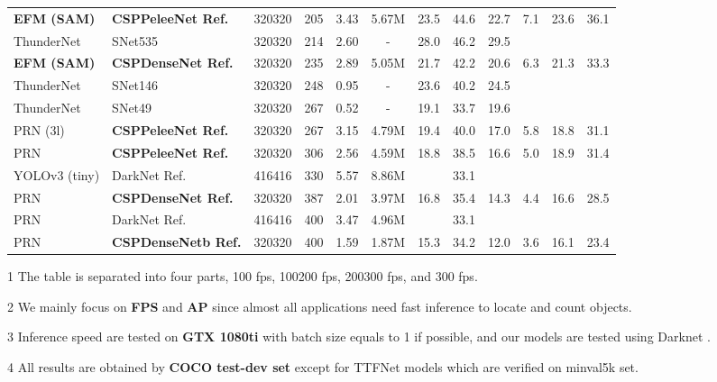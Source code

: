 \documentclass{article}
\begin{document}
\begin{table*}[t]
\begin{threeparttable}[t]
\begin{tabular}{llcccccccccc}
			\midrule
			\textbf{EFM (SAM)} \cite{wang2019enriching} & \textbf{CSPPeleeNet Ref.}  & 320320 & 205 & 3.43 & 5.67M & 23.5 & 44.6 & 22.7 & 7.1 & 23.6 & 36.1 \\	
			ThunderNet \cite{qin2019thundernet} & SNet535 \cite{qin2019thundernet} & 320320 & 214 & 2.60 & - & 28.0 & 46.2 & 29.5 &  &  &  \\
			\textbf{EFM (SAM)} \cite{wang2019enriching} & \textbf{CSPDenseNet Ref.}  & 320320 & 235 & 2.89 & 5.05M & 21.7 & 42.2 & 20.6 & 6.3 & 21.3 & 33.3 \\	
			ThunderNet \cite{qin2019thundernet} & SNet146 \cite{qin2019thundernet} & 320320 & 248 & 0.95 & - & 23.6 & 40.2 & 24.5 &  &  &  \\
			ThunderNet \cite{qin2019thundernet} & SNet49 \cite{qin2019thundernet} & 320320 & 267 & 0.52 & - & 19.1 & 33.7 & 19.6 &  &  & \\	
			PRN (3l) \cite{wang2019enriching} & \textbf{CSPPeleeNet Ref.}  & 320320 & 267 & 3.15 & 4.79M & 19.4 & 40.0 & 17.0 & 5.8 & 18.8 & 31.1 \\				
			\midrule
			PRN \cite{wang2019enriching} & \textbf{CSPPeleeNet Ref.}  & 320320 & 306 & 2.56 & 4.59M & 18.8 & 38.5 & 16.6 & 5.0 & 18.9 & 31.4 \\			
			YOLOv3 (tiny) \cite{redmon2018yolov3} & DarkNet Ref. \cite{redmon2018yolov3} & 416416 & 330 & 5.57 & 8.86M &  & 33.1 &  &  &  &  \\
			PRN \cite{wang2019enriching} & \textbf{CSPDenseNet Ref.}  & 320320 & 387 & 2.01 & 3.97M & 16.8 & 35.4 & 14.3 & 4.4 & 16.6 & 28.5 \\			
			PRN \cite{wang2019enriching} & DarkNet Ref. \cite{redmon2018yolov3} & 416416 & 400 & 3.47 & 4.96M &  & 33.1 &  &  &  &  \\
			PRN \cite{wang2019enriching} & \textbf{CSPDenseNetb Ref.}  & 320320 & 400 & 1.59 & 1.87M & 15.3 & 34.2 & 12.0 & 3.6 & 16.1 & 23.4 \\				
			\midrule
			\bottomrule
		\end{tabular}
		\begin{tablenotes}[flushleft]
			\footnotesize
			\item[1] The table is separated into four parts, 100 fps, 100200 fps, 200300 fps, and 300 fps.
			\item[2] We mainly focus on \textbf{FPS} and \textbf{AP} since almost all applications need fast inference to locate and count objects.
			\item[3] Inference speed are tested on \textbf{GTX 1080ti} with batch size equals to 1 if possible, and our models are tested using Darknet \cite{alexeyab84_darknet}.
			\item[4] All results are obtained by \textbf{COCO test-dev set} except for TTFNet \cite{liu2019training} models which are verified on minval5k set.
		\end{tablenotes}
	\end{threeparttable}
\end{table*}
\end{document}
